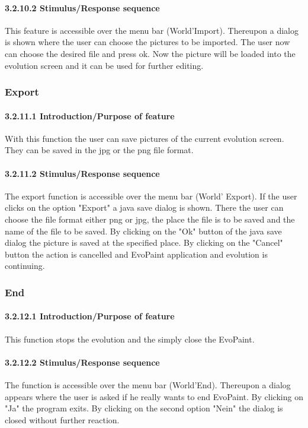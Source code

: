 \documentclass[titlepage,12pt]{scrartcl}
\begin{document}
\paragraph{3.2.10.2	Stimulus/Response sequence}
This feature is accessible over the menu bar (World'Import). Thereupon a dialog is shown where the user can choose the pictures to be imported. The user now can choose the desired file and press ok. Now the picture will be loaded into the evolution screen and it can be used for further editing.

\subsubsection{Export}
\paragraph{3.2.11.1	Introduction/Purpose of feature}
With this function the user can save pictures of the current evolution screen. They can be saved in the jpg or the png file format. 
\paragraph{3.2.11.2	Stimulus/Response sequence}
The export function is accessible over the menu bar (World' Export). If the user clicks on the option "Export" a java save dialog is shown. There the user can choose the file format either png or jpg, the place the file is to be saved and the name of the file to be saved. By clicking on the "Ok" button of the java save dialog the picture is saved at the specified place. By clicking on the "Cancel" button the action is cancelled and EvoPaint application and evolution is continuing.

\subsubsection{End}
\paragraph{3.2.12.1	Introduction/Purpose of feature}
This function stops the evolution and the simply close the EvoPaint. 
\paragraph{3.2.12.2	Stimulus/Response sequence}
The function is accessible over the menu bar (World'End). Thereupon a dialog appears where the user is asked if he really wants to end EvoPaint. By clicking on "Ja" the program exits. By clicking on the second option "Nein" the dialog is closed without further reaction.
\end{document}
